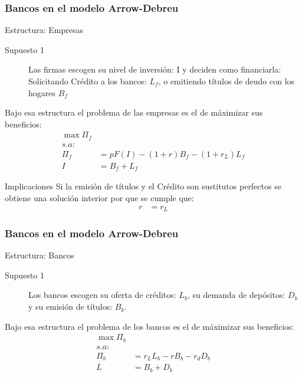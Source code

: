 \documentclass[10pt, xcolor=table, x11names]{beamer}
\begin{document}
\begin{frame}
    \frametitle{{\normalsize Bancos en el modelo Arrow-Debreu} {}}
     \begin{block} {Estructura: Empresas}
        \begin{description}
            \item[Supuesto 1] Las firmas escogen su nivel de inversión: I y deciden como financiarla: Solicitando Crédito a los bancos: $L_{f}$, o emitiendo títulos de deudo con los hogares $B_{f}$
            \end{description}
        Bajo esa estructura el problema de las empresas es el de máximizar sus beneficios:
        \begin{align}
        \max \Pi_{f}\nonumber \\
        s.a:\nonumber\\
        \Pi_{f}&= pF(I)-(1+r)B_{f}-(1+r_{L})L_{f}\nonumber\\      
        I&=B_{f}+L_{f}\nonumber
       \end{align}
    \end{block}	
    \begin{block} {Implicaciones}
        Si la emisión de títulos y el Crédito son sustitutos perfectos se obtiene una solución interior por que se cumple que:
        \begin{align}
        r&=r_{L}
        \end{align} 
     \end{block}
   
\end{frame}



\begin{frame}
    \frametitle{{\normalsize Bancos en el modelo Arrow-Debreu} {}}
    \begin{block} {Estructura: Bancos}
        \begin{description}
            \item[Supuesto 1] Los bancos escogen su oferta de créditos: $L_{b}$, su demanda de depósitos: $D_{b}$ y su emisión de títulos: $B_{b} $.
        \end{description}
        Bajo esa estructura el problema de los bancos es el de máximizar sus beneficios:
        \begin{align}
        \max \Pi_{b}\nonumber \\
        s.a:\nonumber\\
        \Pi_{b}&= r_{L}L_{b}-rB_{b}-r_{d}D_{b}\nonumber\\      
        L&=B_{b}+D_{b}\nonumber
        \end{align}
    \end{block}	
 \end{frame}
\end{document}
